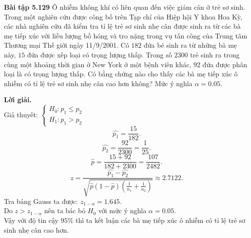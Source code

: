 \begin{mybox}
\textbf{Bài tập 5.129} Ô nhiễm không khí có liên quan đến việc giảm cân ở trẻ sơ sinh. Trong một nghiên cứu được công bố trên Tạp chí của Hiệp hội Y khoa Hoa Kỳ, các nhà nghiên cứu đã kiểm tra tỉ lệ trẻ sơ sinh nhẹ cân được sinh ra từ các bà mẹ tiếp xúc với liều lượng bồ hóng và tro nặng trong vụ tấn công của Trung tâm Thương mại Thế giới ngày 11/9/2001. Có $182$ đứa bé sinh ra từ những bà mẹ này, $15$ đứa được xếp loại có trọng lượng thấp. Trong số $2300$ trẻ sinh ra trong cùng một khoảng thời gian ở New York ở một bệnh viên khác, $92$ đứa được phân loại là có trọng lượng thấp. Có bằng chứng nào cho thấy các bà mẹ tiếp xúc ô nhiễm có tỉ lệ trẻ sơ sinh nhẹ cân cao hơn không? Mức ý nghĩa $\alpha = 0.05.$
\end{mybox}
\textbf{Lời giải.}\\
Giả thuyết: $\begin{cases}
H_0: p_1 \leqslant p_2\\
H_1: p_1 > p_2
\end{cases}$\\
$$\widehat{p_1} = \frac{15}{182}.$$
$$\widehat{p_2} = \frac{92}{2300} = \frac{1}{25}.$$
$$\widehat{p} = \frac{15 + 92}{182 + 2300} = \frac{107}{2482}.$$
$$z = \frac{{\widehat {{p_1}} - \widehat {{p_2}}}}{{\sqrt {\widehat p\left( {1 - \widehat p} \right)\left( {\frac{1}{{{n_1}}} + \frac{1}{{{n_2}}}} \right)} }} \approx 2.7122.$$
Tra bảng Gauss ta được: $z_{1 - \alpha} = 1.645.$\\
Do $z > z_{1 - \alpha}$ nên ta bác bỏ $H_0$ với mức ý nghĩa $\alpha = 0.05.$\\
Vậy với độ tin cậy $95\%$ thì ta kết luận các bà mẹ tiếp xúc ô nhiễm có tỉ lệ trẻ sơ sinh nhẹ cân cao hơn.

